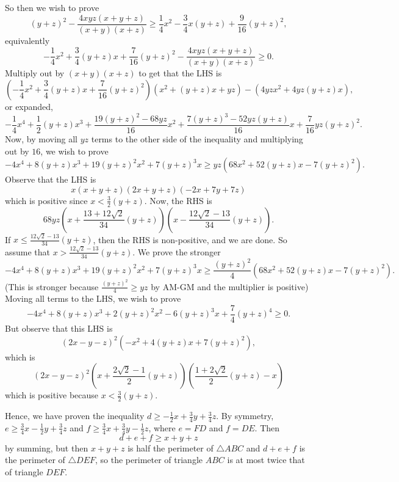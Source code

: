 So then we wish to prove \[\left(y+z\right)^2-\frac{4xyz\left(x+y+z\right)}{\left(x+y\right)\left(x+z\right)}\geq\frac{1}{4}x^2-\frac{3}{4}x\left(y+z\right)+\frac{9}{16}\left(y+z\right)^2,\] equivalently \[-\frac{1}{4}x^2+\frac{3}{4}\left(y+z\right)x+\frac{7}{16}\left(y+z\right)^2-\frac{4xyz\left(x+y+z\right)}{\left(x+y\right)\left(x+z\right)}\geq0.\] Multiply out by $\left(x+y\right)\left(x+z\right)$ to get that the LHS is \[\left(-\frac{1}{4}x^2+\frac{3}{4}\left(y+z\right)x+\frac{7}{16}\left(y+z\right)^2\right)\left(x^2+\left(y+z\right)x+yz\right)-\left(4yzx^2+4yz\left(y+z\right)x\right),\] or expanded, \[-\frac{1}{4}x^4+\frac{1}{2}\left(y+z\right)x^3+\frac{19\left(y+z\right)^2-68yz}{16}x^2+\frac{7\left(y+z\right)^3-52yz\left(y+z\right)}{16}x+\frac{7}{16}yz\left(y+z\right)^2.\] Now, by moving all $yz$ terms to the other side of the inequality and multiplying out by $16$, we wish to prove \[-4x^4+8\left(y+z\right)x^3+19\left(y+z\right)^2x^2+7\left(y+z\right)^3x\geq yz\left(68x^2+52\left(y+z\right)x-7\left(y+z\right)^2\right).\] Observe that the LHS is \[x\left(x+y+z\right)\left(2x+y+z\right)\left(-2x+7y+7z\right)\] which is positive since $x<\frac{3}{2}\left(y+z\right)$. Now, the RHS is \[68yz\left(x+\frac{13+12\sqrt{2}}{34}\left(y+z\right)\right)\left(x-\frac{12\sqrt{2}-13}{34}\left(y+z\right)\right).\] If $x\leq\frac{12\sqrt{2}-13}{34}\left(y+z\right)$, then the RHS is non-positive, and we are done. So assume that $x>\frac{12\sqrt{2}-13}{34}\left(y+z\right)$. We prove the stronger \[-4x^4+8\left(y+z\right)x^3+19\left(y+z\right)^2x^2+7\left(y+z\right)^3x\geq\frac{\left(y+z\right)^2}{4}\left(68x^2+52\left(y+z\right)x-7\left(y+z\right)^2\right).\] (This is stronger because $\frac{\left(y+z\right)^2}{4}\geq yz$ by AM-GM and the multiplier is positive) Moving all terms to the LHS, we wish to prove \[-4x^4+8\left(y+z\right)x^3+2\left(y+z\right)^2x^2-6\left(y+z\right)^3x+\frac{7}{4}\left(y+z\right)^4\geq0.\] But observe that this LHS is \[\left(2x-y-z\right)^2\left(-x^2+4\left(y+z\right)x+7\left(y+z\right)^2\right),\] which is \[\left(2x-y-z\right)^2\left(x+\frac{2\sqrt{2}-1}{2}\left(y+z\right)\right)\left(\frac{1+2\sqrt{2}}{2}\left(y+z\right)-x\right)\] which is positive because $x<\frac{3}{2}\left(y+z\right)$.

Hence, we have proven the inequality $d\geq-\frac{1}{2}x+\frac{3}{4}y+\frac{3}{4}z$. By symmetry, $e\geq\frac{3}{4}x-\frac{1}{2}y+\frac{3}{4}z$ and $f\geq\frac{3}{4}x+\frac{3}{4}y-\frac{1}{2}z$, where $e=FD$ and $f=DE$. Then \[d+e+f\geq x+y+z\] by summing, but then $x+y+z$ is half the perimeter of $\triangle{ABC}$ and $d+e+f$ is the perimeter of $\triangle{DEF}$, so the perimeter of triangle $ABC$ is at most twice that of triangle $DEF$.